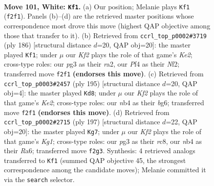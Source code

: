 \documentclass[11pt]{article}
\begin{document}
\clearpage

\begin{figure}[p]\centering
\begin{subfigure}{0.46\textwidth}\centering
\resizebox{\linewidth}{!}{%
\newchessgame
\chessboard[
  setfen={3r4/5pk1/6p1/4P3/1n3P2/1B4p1/5K2/8 w - - 0 101},
  showmover=false,
  pgfstyle=straightmove, color=movearrow, markmove={f2-f1}
]}
\caption{}
\end{subfigure}\hfill
\begin{subfigure}{0.46\textwidth}\centering
\resizebox{\linewidth}{!}{%
\newchessgame
\chessboard[
  setfen={8/6k1/5p2/4pP2/2p3P1/2B5/r3KN2/8 w - - 42 94},
  showmover=false,
  pgfstyle=straightmove, color=movearrow, markmove={e2-f1}
]}
\caption{}
\end{subfigure}
\\[4pt]
\begin{subfigure}{0.46\textwidth}\centering
\resizebox{\linewidth}{!}{%
\newchessgame
\chessboard[
  setfen={8/4k3/3pP1B1/3P4/1PK5/8/8/4b3 b - - 6 98},
  showmover=false,
  pgfstyle=straightmove, color=movearrow, markmove={e7-d8}
]}
\caption{}
\end{subfigure}\hfill
\begin{subfigure}{0.46\textwidth}\centering
\resizebox{\linewidth}{!}{%
\newchessgame
\chessboard[
  setfen={2R3k1/8/r5p1/4b1Np/7P/6P1/5PK1/8 b - - 56 99},
  showmover=false,
  pgfstyle=straightmove, color=movearrow, markmove={g8-g7}
]}
\caption{}
\end{subfigure}
\caption{\textbf{Move 101, White: \texttt{Kf1}.} (a) Our position; Melanie plays \texttt{Kf1} (\texttt{f2f1}). Panels (b)--(d) are the retrieved master positions whose correspondence most drove this move (highest QAP objective among those that transfer to it). (b) Retrieved from \texttt{ccrl\_top\_p0002\#3719} (ply 186) [structural distance $d$=20, QAP obj=20]: the master played \texttt{Kf1}; under $\mu$ our \emph{Kf2} plays the role of that game's \emph{Ke2}; cross-type roles: our \emph{p}g3 as their \emph{r}a2, our \emph{P}f4 as their \emph{N}f2; transferred move \texttt{f2f1} \textbf{(endorses this move)}. (c) Retrieved from \texttt{ccrl\_top\_p0003\#2457} (ply 195) [structural distance $d$=20, QAP obj=4]: the master played \texttt{Kd8}; under $\mu$ our \emph{Kf2} plays the role of that game's \emph{Ke2}; cross-type roles: our \emph{n}b4 as their \emph{b}g6; transferred move \texttt{f2f1} \textbf{(endorses this move)}. (d) Retrieved from \texttt{ccrl\_top\_p0002\#2715} (ply 197) [structural distance $d$=22, QAP obj=20]: the master played \texttt{Kg7}; under $\mu$ our \emph{Kf2} plays the role of that game's \emph{Kg1}; cross-type roles: our \emph{p}g3 as their \emph{r}c8, our \emph{n}b4 as their \emph{R}a6; transferred move \texttt{f2g3}. Synthesis: 4 retrieved analogs transferred to \texttt{Kf1} (summed QAP objective 45, the strongest correspondence among the candidate moves); Melanie committed it via the \texttt{search} selector.}
\label{fig:thought-m200}
\end{figure}
\end{document}
